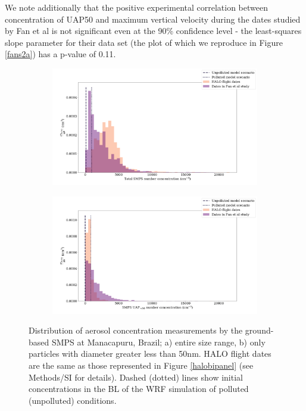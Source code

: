\documentclass{article}
\begin{document}
We note additionally that the positive experimental correlation between concentration of UAP50 and maximum vertical velocity during the dates studied by Fan et al is not significant even at the 90\% confidence level - the least-squares slope parameter for their data set (the plot of which we reproduce in Figure \ref{fans2a}) has a p-value of 0.11.
\begin{figure}[ht]
	\centering
	\begin{subfigure}{0.7\textwidth}
		\includegraphics[width=\textwidth]{goama/v1_FINAL_tot_compare_nconc_hist_alldates_figure.png}
		\label{goamatothist}
		\caption{}
	\end{subfigure}
	\begin{subfigure}{0.7\textwidth}
		\includegraphics[width=\textwidth]{goama/v1_FINAL_uap50_compare_nconc_hist_alldates_figure.png}
		\label{goamauap50hist}
		\caption{}
	\end{subfigure}
	\caption{Distribution of aerosol concentration measurements by the ground-based SMPS at Manacapuru, Brazil; a) entire size range, b) only particles with diameter greater less than 50nm. HALO flight dates are the same as those represented in Figure \ref{halobipanel} (see Methods/SI for details). Dashed (dotted) lines show initial concentrations in the BL of the WRF simulation of polluted (unpolluted) conditions.}
	\label{goamahist}
\end{figure}
\end{document}
